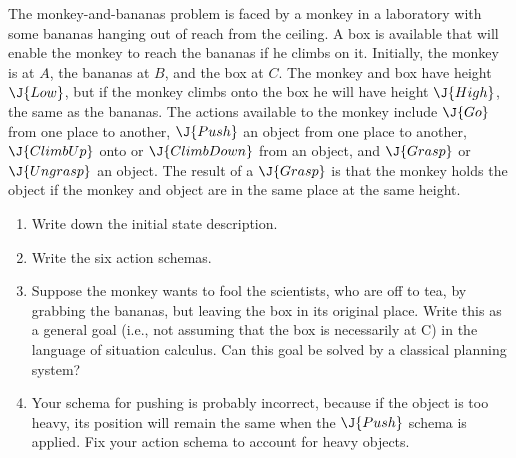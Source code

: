 \begin{exercise}
The monkey-and-bananas problem
 is faced by a monkey in a
laboratory with some bananas hanging out of reach from the ceiling. A
box is available that will enable the monkey to reach the bananas if
he climbs on it. Initially, the monkey is at \(A\), the bananas at \(B\),
and the box at \(C\). The monkey and box have height \(\J{Low}\), but if the
monkey climbs onto the box he will have height \(\J{High}\), the same as the
bananas.  The actions available to the monkey include \(\J{Go}\) from one
place to another, \(\J{Push}\) an object from one place to another,
\(\J{ClimbUp}\) onto or \(\J{ClimbDown}\) from an object, and \(\J{Grasp}\) or \(\J{Ungrasp}\)
an object. The  result of a \(\J{Grasp}\) is that the monkey holds the object if the
monkey and object are in the same place at the same height.
\begin{enumerate}
\item Write down the initial state description.

\item Write the six action schemas.

\item Suppose the monkey wants to fool the scientists, who are off to tea,
by grabbing the bananas, but leaving the box in its original
place. Write this as a general goal (i.e., not assuming that the box is
necessarily at C) in the language of situation calculus. Can this goal be
solved by a classical planning system?

\item Your schema for pushing is probably incorrect, because if the object
is too heavy, its position will remain the same when the \(\J{Push}\) 
schema is applied.  Fix your action schema to account for 
heavy objects.
\end{enumerate}
\end{exercise} 

